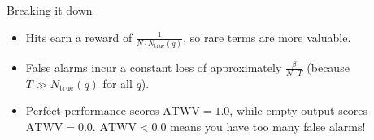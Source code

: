 \begin{frame}{Breaking it down}{}
  \begin{overlayarea}{\textwidth}{56mm}
  \vspace*{8mm}
  \begin{itemize}
  \item<1-> Hits earn a reward of $\frac{1}{N \cdot N_{\text{true}}(q)}$, so
    rare terms are more valuable.
  \item<2-> False alarms incur a constant loss of approximately
    $\frac{\beta}{N \cdot T}$ (because $T \gg N_{\text{true}}(q)$ for all $q$).
  \item<3-> Perfect performance scores $\text{ATWV} = 1.0$, while
    empty output scores $\text{ATWV} = 0.0$.  $\text{ATWV} < 0.0$
    means you have too many false alarms!
  \end{itemize}
  \end{overlayarea}
  \vfill
\end{frame}

